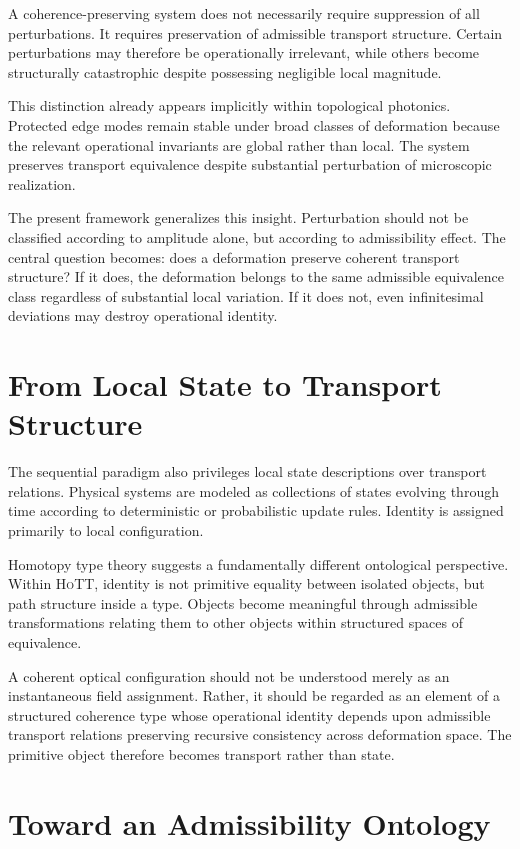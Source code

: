 \documentclass[11pt,openany]{book}
\theoremstyle{definition}
\theoremstyle{plain}
\newcommand{\HoTT}{\textsc{HoTT}}
\begin{document}
A coherence-preserving system does not necessarily require suppression of all perturbations. It requires preservation of admissible transport structure. Certain perturbations may therefore be operationally irrelevant, while others become structurally catastrophic despite possessing negligible local magnitude.

This distinction already appears implicitly within topological photonics. Protected edge modes remain stable under broad classes of deformation because the relevant operational invariants are global rather than local. The system preserves transport equivalence despite substantial perturbation of microscopic realization.

The present framework generalizes this insight. Perturbation should not be classified according to amplitude alone, but according to admissibility effect. The central question becomes: does a deformation preserve coherent transport structure? If it does, the deformation belongs to the same admissible equivalence class regardless of substantial local variation. If it does not, even infinitesimal deviations may destroy operational identity.

\section{From Local State to Transport Structure}

The sequential paradigm also privileges local state descriptions over transport relations. Physical systems are modeled as collections of states evolving through time according to deterministic or probabilistic update rules. Identity is assigned primarily to local configuration.

Homotopy type theory suggests a fundamentally different ontological perspective. Within \HoTT, identity is not primitive equality between isolated objects, but path structure inside a type. Objects become meaningful through admissible transformations relating them to other objects within structured spaces of equivalence.

A coherent optical configuration should not be understood merely as an instantaneous field assignment. Rather, it should be regarded as an element of a structured coherence type whose operational identity depends upon admissible transport relations preserving recursive consistency across deformation space. The primitive object therefore becomes transport rather than state.

\section{Toward an Admissibility Ontology}
\end{document}

